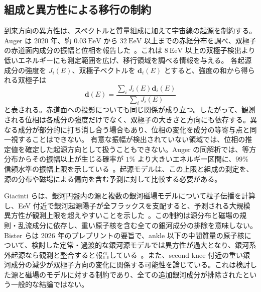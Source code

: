 \documentclass[book,paper=a4,fontsize=11pt]{jlreq}
\begin{document}
\subsection{組成と異方性による移行の制約}\label{subsec:transition_anisotropy}
到来方向の異方性は、スペクトルと質量組成に加えて宇宙線の起源を制約する。Auger は 2020 年、約 \(0.03\ \mathrm{EeV}\) から \(32\ \mathrm{EeV}\) 以上までの赤経分布を調べ、双極子の赤道面内成分の振幅と位相を報告した~\cite{AugerAnisotropy2020}。これは \(8\ \mathrm{EeV}\) 以上の双極子検出より低いエネルギーにも測定範囲を広げ、移行領域を調べる情報を与える。
各起源成分の強度を \(J_i(E)\)、双極子ベクトルを \(\boldsymbol d_i(E)\) とすると、強度の和から得られる双極子は
\begin{equation}
  \boldsymbol d(E)=\frac{\sum_i J_i(E)\boldsymbol d_i(E)}{\sum_i J_i(E)}
  \label{eq:dipole_mixture}
\end{equation}
と表される。赤道面への投影についても同じ関係が成り立つ。したがって、観測される位相は各成分の強度だけでなく、双極子の大きさと方向にも依存する。異なる成分が部分的に打ち消し合う場合もあり、位相の変化を成分の等寄与点と同一視することはできない。
有意な振幅が検出されていない領域では、位相の推定値を確定した起源方向として扱うこともできない。Auger の同解析では、等方分布からその振幅以上が生じる確率が \(1\%\) より大きいエネルギー区間に、\(99\%\) 信頼水準の振幅上限を示している~\cite{AugerAnisotropy2020}。起源モデルは、この上限と組成の測定を、源の分布や磁場による偏向を含む予測に対して比較する必要がある。

Giacinti らは、銀河円盤内の源と複数の銀河磁場モデルについて粒子伝播を計算し、EeV 付近で銀河起源陽子が全フラックスを支配すると、予測される大規模異方性が観測上限を超えやすいことを示した~\cite{Giacinti2012Transition}。この制約は源分布と磁場の規則・乱流成分に依存し、重い原子核を含む全ての銀河成分の排除を意味しない。
Bister らは 2026 年のプレプリントの要旨で、ankle 以下の中間質量の原子核について、検討した定常・過渡的な銀河源モデルでは異方性が過大となり、銀河系外起源なら観測と整合すると報告している~\cite{Bister2026Transition}。また、second knee 付近の重い銀河成分の減少が双極子方向の変化に関係する可能性を論じている。これは検討した源と磁場のモデルに対する制約であり、全ての追加銀河成分が排除されたという一般的な結論ではない。
\end{document}
